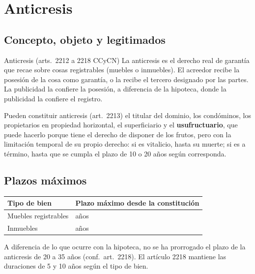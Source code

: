 \documentclass[12pt,oneside]{book}
\begin{document}
\section{Anticresis}

\subsection{Concepto, objeto y legitimados}

\begin{definicion}{Anticresis (arts.~2212 a 2218 CCyCN)}
La anticresis es el derecho real de garantía que recae sobre cosas registrables (muebles o inmuebles). El acreedor recibe la posesión de la cosa como garantía, o la recibe el tercero designado por las partes. La publicidad la confiere la posesión, a diferencia de la hipoteca, donde la publicidad la confiere el registro.
\end{definicion}

Pueden constituir anticresis (art.~2213) el titular del dominio, los condóminos, los propietarios en propiedad horizontal, el superficiario y el \textbf{usufructuario}, que puede hacerlo porque tiene el derecho de disponer de los frutos, pero con la limitación temporal de su propio derecho: si es vitalicio, hasta su muerte; si es a término, hasta que se cumpla el plazo de 10 o 20 años según corresponda.

\subsection{Plazos máximos}

\begin{table}[H]
\centering
\begin{tabularx}{\textwidth}{@{}>{\raggedright\arraybackslash}p{}>{\raggedright\arraybackslash}X@{}}
\toprule
\textbf{Tipo de bien} & \textbf{Plazo máximo desde la constitución} \\
\midrule
Muebles registrables & 5 años \\
Inmuebles & 10 años \\
\bottomrule
\end{tabularx}
\end{table}

\begin{nota}
A diferencia de lo que ocurre con la hipoteca, no se ha prorrogado el plazo de la anticresis de 20 a 35 años (conf.~art.~2218). El artículo 2218 mantiene las duraciones de 5 y 10 años según el tipo de bien.
\end{nota}
\end{document}
